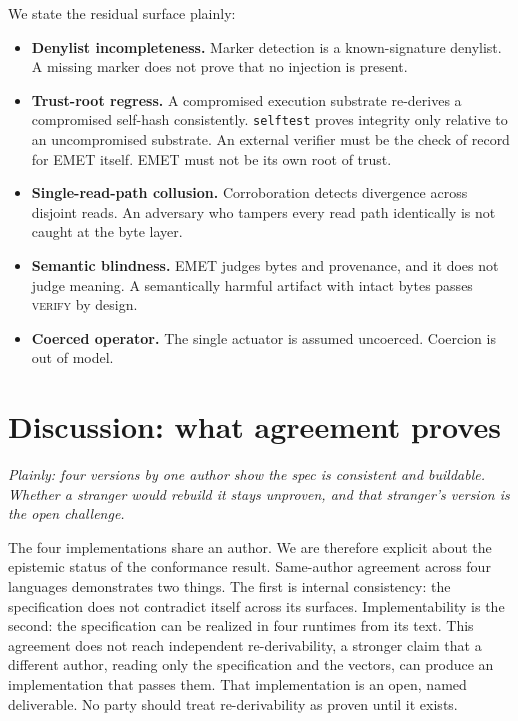 \documentclass[11pt]{article}
\begin{document}
We state the residual surface plainly:
\begin{itemize}[leftmargin=*,itemsep=1pt]
\item \textbf{Denylist incompleteness.} Marker detection is a known-signature denylist. A missing marker does not prove that no injection is present.
\item \textbf{Trust-root regress.} A compromised execution substrate re-derives a compromised self-hash consistently. \texttt{selftest} proves integrity only relative to an uncompromised substrate. An external verifier must be the check of record for EMET itself. EMET must not be its own root of trust.
\item \textbf{Single-read-path collusion.} Corroboration detects divergence across disjoint reads. An adversary who tampers every read path identically is not caught at the byte layer.
\item \textbf{Semantic blindness.} EMET judges bytes and provenance, and it does not judge meaning. A semantically harmful artifact with intact bytes passes \textsc{verify} by design.
\item \textbf{Coerced operator.} The single actuator is assumed uncoerced. Coercion is out of model.
\end{itemize}

\section{Discussion: what agreement proves}
\label{sec:discussion}
\emph{Plainly: four versions by one author show the spec is consistent and buildable. Whether a stranger would rebuild it stays unproven, and that stranger's version is the open challenge.}

The four implementations share an author. We are therefore explicit about the epistemic status of the conformance result. Same-author agreement across four languages demonstrates two things. The first is internal consistency: the specification does not contradict itself across its surfaces. Implementability is the second: the specification can be realized in four runtimes from its text. This agreement does not reach independent re-derivability, a stronger claim that a different author, reading only the specification and the vectors, can produce an implementation that passes them. That implementation is an open, named deliverable. No party should treat re-derivability as proven until it exists.
\end{document}
